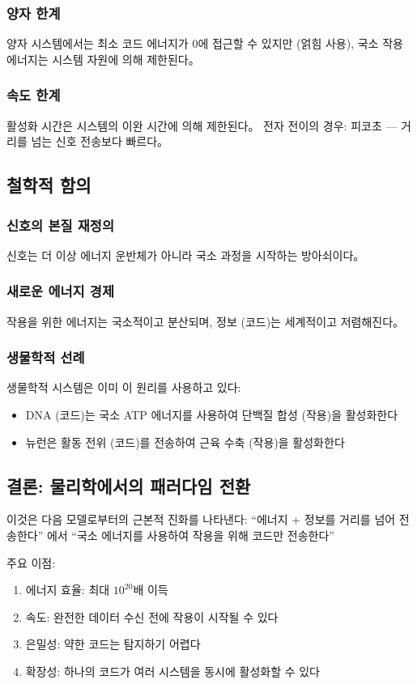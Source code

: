 \documentclass[11pt,a4paper]{article}
\begin{document}
\subsubsection{양자 한계}
양자 시스템에서는 최소 코드 에너지가 0에 접근할 수 있지만 (얽힘 사용), 국소 작용 에너지는 시스템 자원에 의해 제한된다。

\subsubsection{속도 한계}
활성화 시간은 시스템의 이완 시간에 의해 제한된다。 전자 전이의 경우: 피코초 — 거리를 넘는 신호 전송보다 빠르다。

\subsection{철학적 함의}

\subsubsection{신호의 본질 재정의}
신호는 더 이상 에너지 운반체가 아니라 국소 과정을 시작하는 방아쇠이다。

\subsubsection{새로운 에너지 경제}
작용을 위한 에너지는 국소적이고 분산되며, 정보 (코드)는 세계적이고 저렴해진다。

\subsubsection{생물학적 선례}
생물학적 시스템은 이미 이 원리를 사용하고 있다:
\begin{itemize}
\item DNA (코드)는 국소 ATP 에너지를 사용하여 단백질 합성 (작용)을 활성화한다
\item 뉴런은 활동 전위 (코드)를 전송하여 근육 수축 (작용)을 활성화한다
\end{itemize}

\subsection{결론: 물리학에서의 패러다임 전환}

이것은 다음 모델로부터의 근본적 진화를 나타낸다:
``에너지 + 정보를 거리를 넘어 전송한다''
에서
``국소 에너지를 사용하여 작용을 위해 코드만 전송한다''

주요 이점:
\begin{enumerate}
\item 에너지 효율: 최대 $10^{20}$배 이득
\item 속도: 완전한 데이터 수신 전에 작용이 시작될 수 있다
\item 은밀성: 약한 코드는 탐지하기 어렵다
\item 확장성: 하나의 코드가 여러 시스템을 동시에 활성화할 수 있다
\end{enumerate}
\end{document}
